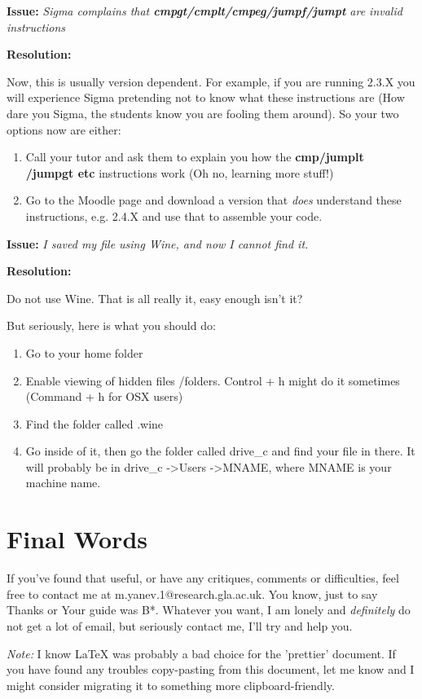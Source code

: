 \documentclass[11pt,a4paper]{article}
\begin{document}
\textbf{Issue:}
 \textit{Sigma complains that \textbf{cmpgt/cmplt/cmpeg/jumpf/jumpt} are invalid instructions}
 
\textbf{Resolution:}

Now, this is usually version dependent. For example, if you are running 2.3.X you will experience Sigma pretending not to know what these instructions are (How dare you Sigma, the students know you are fooling them around). So your two options now are either:
\begin{enumerate}
    \item Call your tutor and ask them to explain you how the \textbf{cmp/jumplt\\/jumpgt etc} instructions work (Oh no, learning more stuff!)
    \item Go to the Moodle page and download a version that \textit{does} understand these instructions, e.g. 2.4.X and use that to assemble your code.
\end{enumerate}

\textbf{Issue:}
 \textit{I saved my file using Wine, and now I cannot find it.}
 
\textbf{Resolution:}

  Do not use Wine. That is all really it, easy enough isn't it?
  
  But seriously, here is what you should do:
  \begin{enumerate}
      \item Go to your home folder
      \item Enable viewing of hidden files \slash folders. Control + h might do it sometimes (Command + h for OSX users)
      \item Find the folder called .wine
      \item Go inside of it, then go the folder called drive\_c and find your file in there. It will probably be in drive\_c -\textgreater Users -\textgreater MNAME, where MNAME is your machine name.
  \end{enumerate}

\section{Final Words}
 If you've found that useful, or have any critiques, comments or difficulties, feel free to contact me at m.yanev.1@research.gla.ac.uk. You know, just to say Thanks or Your guide was B*. Whatever you want, I am lonely and \textit{definitely} do not get a lot of email, but seriously contact me, I'll try and help you.
 
 \textit{Note:}
  I know LaTeX was probably a bad choice for the 'prettier' document. If you have found any troubles copy-pasting from this document, let me know and I might consider migrating it to something more clipboard-friendly.
\end{document}
